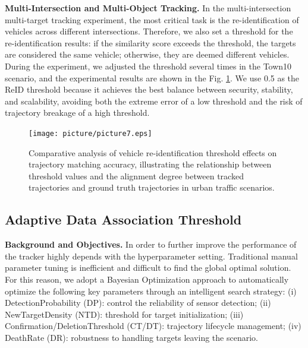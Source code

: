 \documentclass[journal,twoside,web]{ieeecolor}
\begin{document}
\textbf{Multi-Intersection and Multi-Object Tracking.}
In the multi-intersection multi-target tracking experiment, the most critical task is the re-identification of vehicles across different intersections. 
Therefore, we also set a threshold for the re-identification results: if the similarity score exceeds the threshold, the targets are considered the same vehicle; otherwise, they are deemed different vehicles. 
During the experiment, we adjusted the threshold several times in the Town10 scenario, and the experimental results are shown in the Fig. \ref{fig:7}.
We use 0.5 as the ReID threshold because it achieves the best balance between security, stability, and scalability, avoiding both the extreme error of a low threshold and the risk of trajectory breakage of a high threshold.

\begin{figure}[!t]
	\centering
	\centerline{\texttt{[image: picture/picture7.eps]}}
	\caption{Comparative analysis of vehicle re-identification threshold effects on trajectory matching accuracy, illustrating the relationship between threshold values and the alignment degree between tracked trajectories and ground truth trajectories in urban traffic scenarios.} 
	\label{fig:7} 
\end{figure}

\subsection{Adaptive Data Association Threshold}

\textbf{Background and Objectives.}
In order to further improve the performance of the tracker highly depends with the hyperparameter setting. 
Traditional manual parameter tuning is inefficient and difficult to find the global optimal solution. 
For this reason, we adopt a Bayesian Optimization approach to automatically optimize the following key parameters through an intelligent search strategy: (i) DetectionProbability (DP): control the reliability of sensor detection; (ii) NewTargetDensity (NTD): threshold for target initialization; (iii) Confirmation/DeletionThreshold (CT/DT): trajectory lifecycle management; (iv) DeathRate (DR): robustness to handling targets leaving the scenario.
\end{document}
